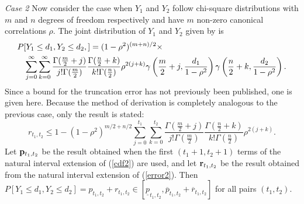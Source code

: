 \documentclass[10pt,letterpaper]{article}
\begin{document}

{\it Case 2}
Now consider the case when $Y_1$ and $Y_2$ follow chi-square distributions
with $m$ and $n$ degrees of freedom respectively and have $m$ non-zero
canonical correlations $\rho$.
The joint distribution of $Y_1$ and $Y_2$ given by \cite{Gunst} is
\begin{eqnarray}
\lefteqn{P[Y_1 \leq d_1, Y_2 \leq d_2, ] = 
  (1-\rho^2)^{(m+n)/2} \times}\nonumber \\
  & & 
  \sum_{j=0}^\infty \sum_{k=0}^\infty 
  \frac{ \Gamma (\frac{m}{2}+j)}{ j! \Gamma (\frac{m}{2})  }
  \frac{ \Gamma (\frac{n}{2}+k)}{ k! \Gamma (\frac{n}{2})  }
  \rho^{2(j+k)} 
  \gamma \left(\frac{m}{2}+j, \frac{d_1}{1-\rho^2} \right)  
  \gamma \left(\frac{n}{2}+k, \frac{d_2}{1-\rho^2} \right). 
  \label{cdf2}
\end{eqnarray}
Since a bound for the truncation error has not previously been published, one
is given here.  Because the method of 
derivation is completely analogous to the previous case, only the result
is stated:
\begin{equation}
\label{error2}
r_{t_1, t_2} \leq 1- (1-\rho^2)^{m/2 + n/2}
  \sum_{j=0}^{t_1} \sum_{k=0}^{t_2} 
  \frac{\Gamma (\frac{m}{2}+j)}{ j! \Gamma (\frac{m}{2}) }
  \frac{\Gamma (\frac{n}{2}+k)}{ k! \Gamma (\frac{n}{2}) }
  \rho^{2(j +k)}.
\end{equation}
Let ${\bf p}_{t_1,t_2}$ be the result obtained when the first 
$(t_1+1, t_2+1)$ terms of the
natural interval extension of (\ref{cdf2}) are used, and let ${\bf r}_{t_1,t_2}$ 
be the
result obtained from the natural interval extension of (\ref{error2}).  Then 
$P[Y_1 \leq d_1, Y_2 \leq d_2] = p_{t_1,t_2} + r_{t_1,t_2}
  \in
 [ \underline{p}_{t_1,t_2} , 
   \overline{ p}_{t_1,t_2} + \overline{ r}_{t_1,t_2}]$
for all pairs $(t_1,t_2)$.

\end{document}
